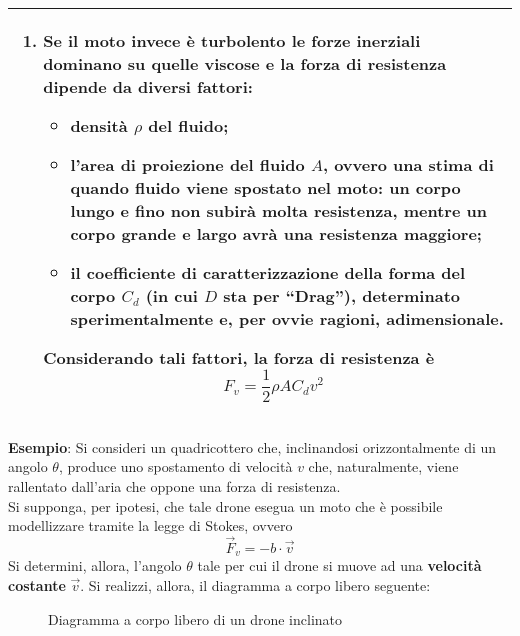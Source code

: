 \documentclass[a4paper]{extarticle}
\newcommand{\quotes}[1]{``#1''}
\begin{document}
\begin{tabularx}{\textwidth}{@{}|P|@{}}
{\begin{enumerate}
      \item Se il \textbf{moto} invece è \textbf{turbolento} le forze inerziali dominano su quelle viscose e la forza di resistenza dipende da diversi fattori:
      \begin{itemize}
        \item \textbf{densità} $\rho$ del fluido;
        \item l'\textbf{area di proiezione} del fluido $A$, ovvero una stima di quando fluido viene spostato nel moto: un corpo lungo e fino non subirà molta resistenza, mentre un corpo grande e largo avrà una resistenza maggiore;
        \item il \textbf{coefficiente di caratterizzazione della forma del corpo} $C_d$ (in cui $D$ sta per \quotes{Drag}), determinato sperimentalmente e, per ovvie ragioni, \textbf{adimensionale}.
      \end{itemize}
      Considerando tali fattori, la forza di resistenza è
      \[\boxed{F_v = \frac{1}{2} \rho A C_d v^2}\]
    \end{enumerate}
    \vspace{1mm}}\\
    \hline
\end{tabularx}

\vspace{1em}
\noindent
\textbf{Esempio}: Si consideri un quadricottero che, inclinandosi orizzontalmente di un angolo $\theta$, produce uno spostamento di velocità $v$ che, naturalmente, viene rallentato dall'aria che oppone una forza di resistenza.\\
Si supponga, per ipotesi, che tale drone esegua un moto che è possibile modellizzare tramite la legge di Stokes, ovvero
\[\vec{F}_v = -b \cdot \vec{v}\]
Si determini, allora, l'angolo $\theta$ tale per cui il drone si muove ad una \textbf{velocità costante} $\vec{v}$. Si realizzi, allora, il diagramma a corpo libero seguente:

\vspace{1em}
\begin{figure}[H]
  \centering
  \caption{Diagramma a corpo libero di un drone inclinato}
  \label{fig:diagramma_corpo_libero_drone_inclina}
\end{figure}
\end{document}
